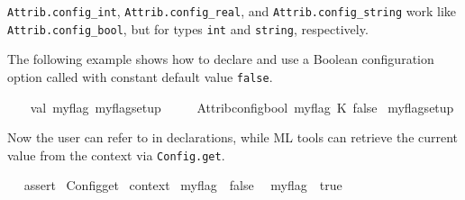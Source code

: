 \begin{isabellebody}
\begin{isamarkuptext}
\begin{description}
  \item \verb|Attrib.config_int|, \verb|Attrib.config_real|, and \verb|Attrib.config_string| work like \verb|Attrib.config_bool|, but for
  types \verb|int| and \verb|string|, respectively.

  \end{description}%
\end{isamarkuptext}%
\isamarkuptrue%
%
\endisatagmlref
{\isafoldmlref}%
%
\isadelimmlref
%
\endisadelimmlref
%
\isadelimmlex
%
\endisadelimmlex
%
\isatagmlex
%
\begin{isamarkuptext}%
The following example shows how to declare and use a
  Boolean configuration option called  with constant
  default value \verb|false|.%
\end{isamarkuptext}%
\isamarkuptrue%
%
\endisatagmlex
{\isafoldmlex}%
%
\isadelimmlex
%
\endisadelimmlex
%
\isadelimML
%
\endisadelimML
%
\isatagML
{}\isamarkupfalse%
\ {\isacharverbatimopen}\isanewline
\ \ val\ {\isacharparenleft}my{\isacharunderscore}flag{\isacharcomma}\ my{\isacharunderscore}flag{\isacharunderscore}setup{\isacharparenright}\ {\isacharequal}\isanewline
\ \ \ \ Attrib{\isachardot}config{\isacharunderscore}bool\ {\isachardoublequote}my{\isacharunderscore}flag{\isachardoublequote}\ {\isacharparenleft}K\ false{\isacharparenright}\isanewline
{\isacharverbatimclose}\isanewline
{}\isamarkupfalse%
\ my{\isacharunderscore}flag{\isacharunderscore}setup%
\endisatagML
{\isafoldML}%
%
\isadelimML
%
\endisadelimML
%
\begin{isamarkuptext}%
Now the user can refer to \hyperlink{attribute.my-flag}{\mbox{}} in
  declarations, while ML tools can retrieve the current value from the
  context via \verb|Config.get|.%
\end{isamarkuptext}%
\isamarkuptrue%
%
\isadelimML
%
\endisadelimML
%
\isatagML
{}\isamarkupfalse%
\ {\isacharverbatimopen}\ %
\isaantiq
assert%
\endisaantiq
\ {\isacharparenleft}Config{\isachardot}get\ %
\isaantiq
context%
\endisaantiq
\ my{\isacharunderscore}flag\ {\isacharequal}\ false{\isacharparenright}\ {\isacharverbatimclose}%
\endisatagML
{\isafoldML}%
%
\isadelimML
%
\endisadelimML
\isanewline
\isanewline
{}\isamarkupfalse%
\ {\isacharbrackleft}{\isacharbrackleft}my{\isacharunderscore}flag\ {\isacharequal}\ true{\isacharbrackright}{\isacharbrackright}\isanewline
%
\isadelimML
\isanewline
%
\endisadelimML
%
\isatagML
{}\isamarkupfalse%

\end{isabellebody}
